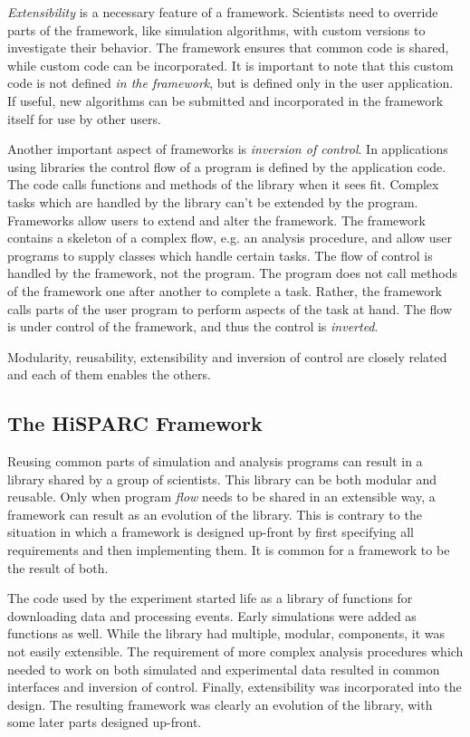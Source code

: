 \emph{Extensibility} is a necessary feature of a framework.  Scientists need to
override parts of the framework, like simulation algorithms, with custom
versions to investigate their behavior.  The framework ensures that common code
is shared, while custom code can be incorporated.  It is important to note that
this custom code is not defined \emph{in the framework}, but is defined only in
the user application.  If useful, new algorithms can be submitted and
incorporated in the framework itself for use by other users.

Another important aspect of frameworks is \emph{inversion of control}.  In
applications using libraries the control flow of a program is defined by the
application code.  The code calls functions and methods of the library when it
sees fit.  Complex tasks which are handled by the library can't be extended by
the program.  Frameworks allow users to extend and alter the framework.  The
framework contains a skeleton of a complex flow, e.g. an analysis procedure, and
allow user programs to supply classes which handle certain tasks.  The flow of
control is handled by the framework, not the program.  The program does not call
methods of the framework one after another to complete a task.  Rather, the
framework calls parts of the user program to perform aspects of the task at
hand.  The flow is under control of the framework, and thus the control is
\emph{inverted}.

Modularity, reusability, extensibility and inversion of control are closely
related and each of them enables the others.


\subsection{The HiSPARC Framework}

Reusing common parts of simulation and analysis programs can result in a library
shared by a group of scientists.  This library can be both modular and reusable.
Only when program \emph{flow} needs to be shared in an extensible way, a
framework can result as an evolution of the library.  This is contrary to the
situation in which a framework is designed up-front by first specifying all
requirements and then implementing them.  It is common for a framework to be the
result of both.

The code used by the \hisparc experiment started life as a library of functions
for downloading data and processing events.  Early simulations were added as
functions as well.  While the library had multiple, modular, components, it was
not easily extensible.  The requirement of more complex analysis procedures
which needed to work on both simulated and experimental data resulted in common
interfaces and inversion of control.  Finally, extensibility was incorporated
into the design.  The resulting framework was clearly an evolution of the
library, with some later parts designed up-front.

